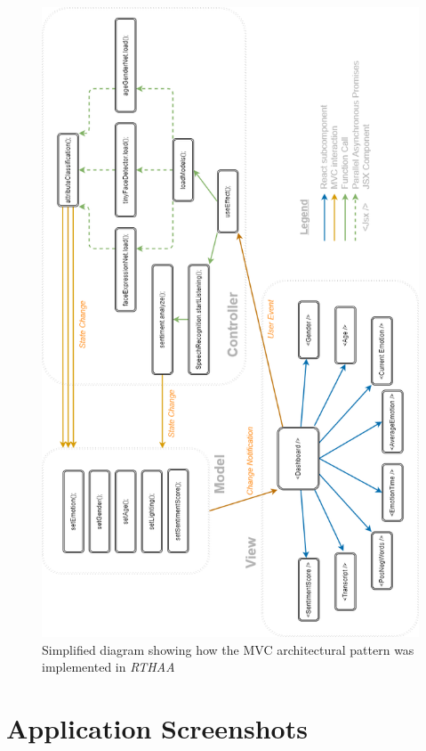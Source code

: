 \documentclass[12pt, a4paper]{article}
\begin{document}
\begin{appendices}
\begin{figure}[H]
    \centering
    \includegraphics[scale=0.72]{diagrams/MVC.png}
    \caption{Simplified diagram showing how the MVC architectural pattern was implemented in \textit{RTHAA}}
    \label{fig:mvc}
\end{figure}

\section{Application Screenshots}
\label{appendix:ass}


\end{appendices}
\end{document}
